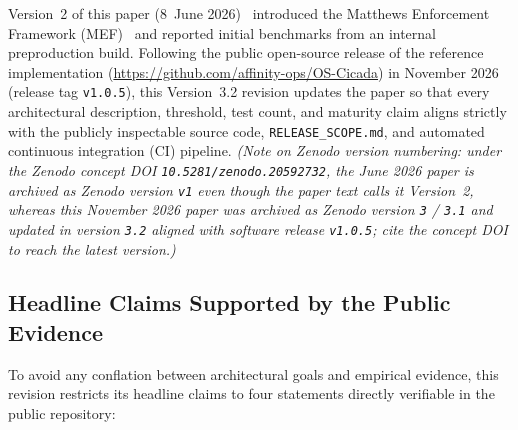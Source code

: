 \documentclass[11pt, a4paper]{article}
\begin{document}
Version~2 of this paper (8~June 2026)~\cite{matthewsv2} introduced the Matthews Enforcement Framework (MEF)~\cite{mef2026} and reported initial benchmarks from an internal preproduction build. Following the public open-source release of the reference implementation (\url{https://github.com/affinity-ops/OS-Cicada}) in November 2026 (release tag \texttt{v1.0.5}), this Version~3.2 revision updates the paper so that every architectural description, threshold, test count, and maturity claim aligns strictly with the publicly inspectable source code, \texttt{RELEASE\_SCOPE.md}, and automated continuous integration (CI) pipeline. \emph{(Note on Zenodo version numbering: under the Zenodo concept DOI \texttt{10.5281/zenodo.20592732}, the June 2026 paper is archived as Zenodo version \texttt{v1} even though the paper text calls it Version~2, whereas this November 2026 paper was archived as Zenodo version \texttt{3} / \texttt{3.1} and updated in version \texttt{3.2} aligned with software release \texttt{v1.0.5}; cite the concept DOI to reach the latest version.)}

\subsection{Headline Claims Supported by the Public Evidence}
\label{subsec:headline-claims}

To avoid any conflation between architectural goals and empirical evidence, this revision restricts its headline claims to four statements directly verifiable in the public repository:
\end{document}
